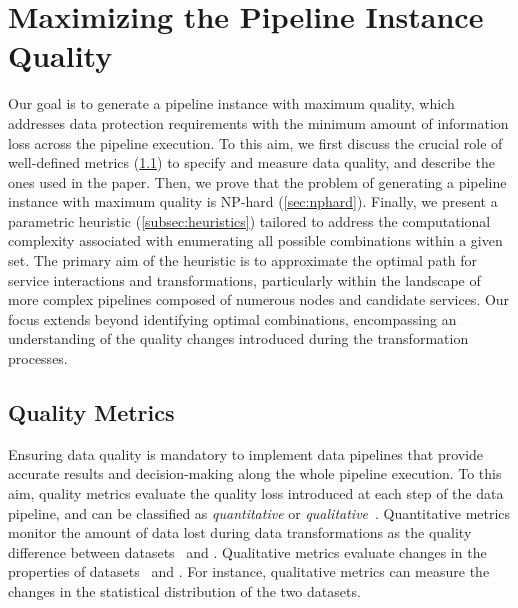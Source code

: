 \section{Maximizing the Pipeline Instance Quality}\label{sec:heuristics}
%
Our goal is to generate a pipeline instance with maximum quality, which addresses data protection requirements with the minimum amount of information loss across the pipeline execution. To this aim, we first discuss the crucial role of well-defined metrics (\cref{sec:metrics}) to specify and measure data quality, and describe the ones used in the paper.
Then, we prove that the problem of generating a pipeline instance with maximum quality is NP-hard (\cref{sec:nphard}). Finally, we present a parametric heuristic (\cref{subsec:heuristics}) tailored to address the computational complexity associated with enumerating all possible combinations within a given set. The primary aim of the heuristic is to approximate the optimal path for service interactions and transformations, particularly within the landscape of more complex pipelines composed of numerous nodes and candidate services. Our focus extends beyond identifying optimal combinations, encompassing an understanding of the quality changes introduced during the transformation processes.


\subsection{Quality Metrics}\label{sec:metrics}
Ensuring data quality is mandatory to implement data pipelines that provide accurate results and decision-making along the whole pipeline execution. To this aim, quality metrics evaluate the quality loss introduced at each step of the data pipeline, and can be classified as \emph{quantitative} or \emph{qualitative}~\cite{ADD}.
Quantitative metrics monitor the amount of data lost during data transformations as the quality difference between datasets \origdataset\ and \transdataset.
Qualitative metrics evaluate changes in the properties of datasets \origdataset\ and \transdataset. For instance, qualitative metrics can measure the changes in the statistical distribution of the two datasets.

